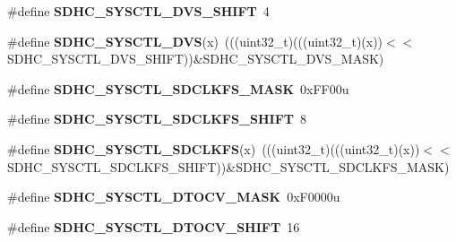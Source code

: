 \begin{DoxyCompactItemize}
\item 
\#define {\bfseries S\+D\+H\+C\+\_\+\+S\+Y\+S\+C\+T\+L\+\_\+\+D\+V\+S\+\_\+\+S\+H\+I\+FT}~4\hypertarget{group__SDHC__Register__Masks_gafc17e8d8673044839bfc65d01ea0bc0b}{}\label{group__SDHC__Register__Masks_gafc17e8d8673044839bfc65d01ea0bc0b}

\item 
\#define {\bfseries S\+D\+H\+C\+\_\+\+S\+Y\+S\+C\+T\+L\+\_\+\+D\+VS}(x)~(((uint32\+\_\+t)(((uint32\+\_\+t)(x))$<$$<$S\+D\+H\+C\+\_\+\+S\+Y\+S\+C\+T\+L\+\_\+\+D\+V\+S\+\_\+\+S\+H\+I\+FT))\&S\+D\+H\+C\+\_\+\+S\+Y\+S\+C\+T\+L\+\_\+\+D\+V\+S\+\_\+\+M\+A\+SK)\hypertarget{group__SDHC__Register__Masks_gaa00d0f672befe002bdc5ab4c68fdf2a5}{}\label{group__SDHC__Register__Masks_gaa00d0f672befe002bdc5ab4c68fdf2a5}

\item 
\#define {\bfseries S\+D\+H\+C\+\_\+\+S\+Y\+S\+C\+T\+L\+\_\+\+S\+D\+C\+L\+K\+F\+S\+\_\+\+M\+A\+SK}~0x\+F\+F00u\hypertarget{group__SDHC__Register__Masks_gabfdc7b569ff6f7eb889833e218ac251f}{}\label{group__SDHC__Register__Masks_gabfdc7b569ff6f7eb889833e218ac251f}

\item 
\#define {\bfseries S\+D\+H\+C\+\_\+\+S\+Y\+S\+C\+T\+L\+\_\+\+S\+D\+C\+L\+K\+F\+S\+\_\+\+S\+H\+I\+FT}~8\hypertarget{group__SDHC__Register__Masks_ga773898be0f7bf2952f8d99428f200f69}{}\label{group__SDHC__Register__Masks_ga773898be0f7bf2952f8d99428f200f69}

\item 
\#define {\bfseries S\+D\+H\+C\+\_\+\+S\+Y\+S\+C\+T\+L\+\_\+\+S\+D\+C\+L\+K\+FS}(x)~(((uint32\+\_\+t)(((uint32\+\_\+t)(x))$<$$<$S\+D\+H\+C\+\_\+\+S\+Y\+S\+C\+T\+L\+\_\+\+S\+D\+C\+L\+K\+F\+S\+\_\+\+S\+H\+I\+FT))\&S\+D\+H\+C\+\_\+\+S\+Y\+S\+C\+T\+L\+\_\+\+S\+D\+C\+L\+K\+F\+S\+\_\+\+M\+A\+SK)\hypertarget{group__SDHC__Register__Masks_ga6478bc3b20101ec058f6005092a8835b}{}\label{group__SDHC__Register__Masks_ga6478bc3b20101ec058f6005092a8835b}

\item 
\#define {\bfseries S\+D\+H\+C\+\_\+\+S\+Y\+S\+C\+T\+L\+\_\+\+D\+T\+O\+C\+V\+\_\+\+M\+A\+SK}~0x\+F0000u\hypertarget{group__SDHC__Register__Masks_gaa17354539833a6acfd128354f34d2e57}{}\label{group__SDHC__Register__Masks_gaa17354539833a6acfd128354f34d2e57}

\item 
\#define {\bfseries S\+D\+H\+C\+\_\+\+S\+Y\+S\+C\+T\+L\+\_\+\+D\+T\+O\+C\+V\+\_\+\+S\+H\+I\+FT}~16\hypertarget{group__SDHC__Register__Masks_ga333315b6c4564242ddc38a7ba077b5ae}{}\label{group__SDHC__Register__Masks_ga333315b6c4564242ddc38a7ba077b5ae}


\end{DoxyCompactItemize}
